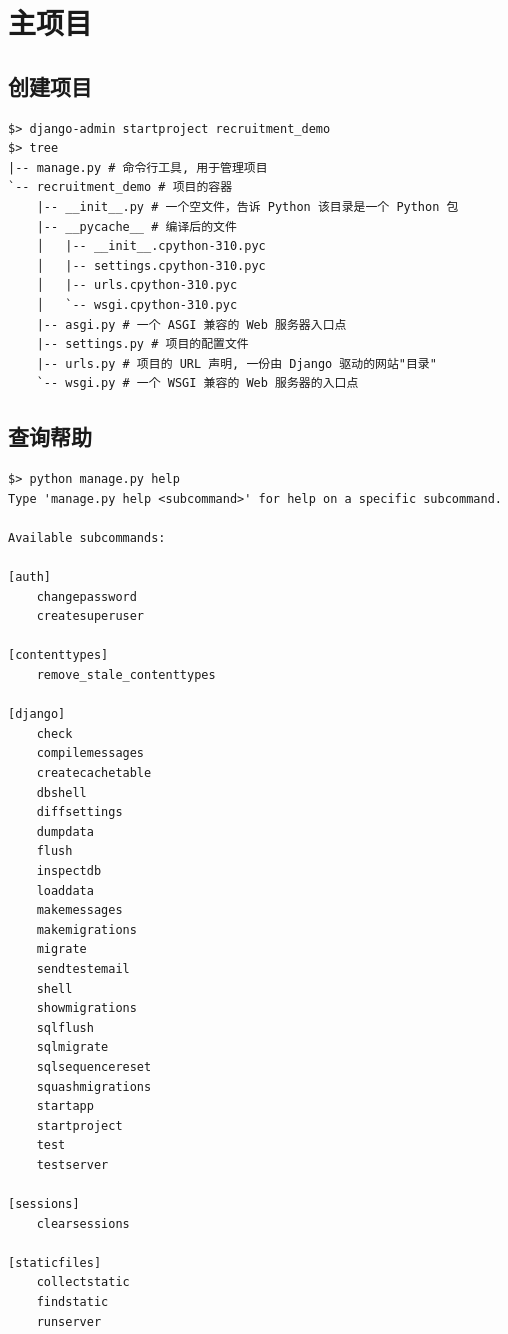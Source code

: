 \section{主项目}
\subsection{创建项目}
\begin{lstlisting}[style=demostyle,numbers=none]
$> django-admin startproject recruitment_demo
$> tree
|-- manage.py # 命令行工具, 用于管理项目
`-- recruitment_demo # 项目的容器
    |-- __init__.py # 一个空文件，告诉 Python 该目录是一个 Python 包
    |-- __pycache__ # 编译后的文件
    │   |-- __init__.cpython-310.pyc
    │   |-- settings.cpython-310.pyc
    │   |-- urls.cpython-310.pyc
    │   `-- wsgi.cpython-310.pyc
    |-- asgi.py # 一个 ASGI 兼容的 Web 服务器入口点
    |-- settings.py # 项目的配置文件
    |-- urls.py # 项目的 URL 声明, 一份由 Django 驱动的网站"目录"
    `-- wsgi.py # 一个 WSGI 兼容的 Web 服务器的入口点
\end{lstlisting}
\subsection{查询帮助}
\begin{lstlisting}[style=demostyle,numbers=none]
$> python manage.py help
Type 'manage.py help <subcommand>' for help on a specific subcommand.

Available subcommands:

[auth]
    changepassword
    createsuperuser

[contenttypes]
    remove_stale_contenttypes

[django]
    check
    compilemessages
    createcachetable
    dbshell
    diffsettings
    dumpdata
    flush
    inspectdb
    loaddata
    makemessages
    makemigrations
    migrate
    sendtestemail
    shell
    showmigrations
    sqlflush
    sqlmigrate
    sqlsequencereset
    squashmigrations
    startapp
    startproject
    test
    testserver

[sessions]
    clearsessions

[staticfiles]
    collectstatic
    findstatic
    runserver
\end{lstlisting}

